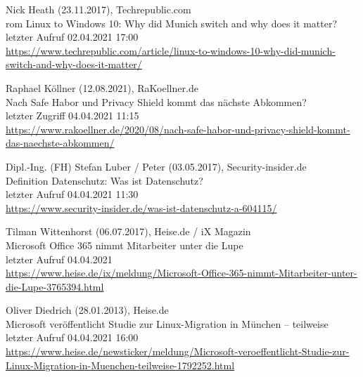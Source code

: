 \begin{thebibliography}{9}
    \bibitem{}
        Nick Heath (23.11.2017), Techrepublic.com
        \\rom Linux to Windows 10: Why did Munich switch and why does it matter?
        \\letzter Aufruf 02.04.2021 17:00
        \\\url{https://www.techrepublic.com/article/linux-to-windows-10-why-did-munich-switch-and-why-does-it-matter/}

    \bibitem{}
        Raphael Köllner (12.08.2021), RaKoellner.de
        \\Nach Safe Habor und Privacy Shield kommt das nächste Abkommen?
        \\letzter Zugriff 04.04.2021 11:15
        \\\url{https://www.rakoellner.de/2020/08/nach-safe-habor-und-privacy-shield-kommt-das-naechste-abkommen/}

    \bibitem{}
        Dipl.-Ing. (FH) Stefan Luber / Peter (03.05.2017), Security-insider.de
        \\Definition Datenschutz: Was ist Datenschutz?
        \\letzter Aufruf 04.04.2021 11:30
        \\\url{https://www.security-insider.de/was-ist-datenschutz-a-604115/}
    \pagebreak

    \bibitem{}
        Tilman Wittenhorst (06.07.2017), Heise.de / iX Magazin
        \\Microsoft Office 365 nimmt Mitarbeiter unter die Lupe
        \\letzter Aufruf 04.04.2021
        \\\url{https://www.heise.de/ix/meldung/Microsoft-Office-365-nimmt-Mitarbeiter-unter-die-Lupe-3765394.html}

    \bibitem{}
        Oliver Diedrich (28.01.2013), Heise.de
        \\Microsoft veröffentlicht Studie zur Linux-Migration in München – teilweise
        \\letzter Aufruf 04.04.2021 16:00
        \\\url{https://www.heise.de/newsticker/meldung/Microsoft-veroeffentlicht-Studie-zur-Linux-Migration-in-Muenchen-teilweise-1792252.html}

\end{thebibliography}